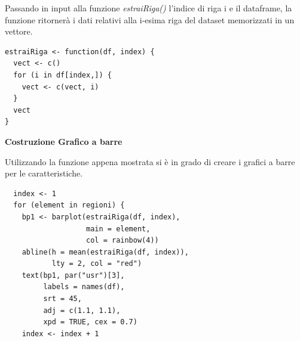 Passando in input alla funzione \textit{estraiRiga()} l'indice di riga i e il dataframe, la funzione ritornerà i dati relativi alla i-esima riga del dataset memorizzati in un vettore.

\vspace{5mm}
\begin{lstlisting}
estraiRiga <- function(df, index) {
  vect <- c()
  for (i in df[index,]) {
    vect <- c(vect, i)
  }
  vect
}
\end{lstlisting}
\vspace{5mm}

\noindent \textbf{Costruzione Grafico a barre}

Utilizzando la funzione appena mostrata si è in grado di creare i grafici a barre per le caratteristiche.

\vspace{5mm}
\begin{lstlisting}
  index <- 1
  for (element in regioni) {
    bp1 <- barplot(estraiRiga(df, index),
                   main = element,
                   col = rainbow(4))
    abline(h = mean(estraiRiga(df, index)),
           lty = 2, col = "red")
    text(bp1, par("usr")[3],
         labels = names(df),
         srt = 45,
         adj = c(1.1, 1.1),
         xpd = TRUE, cex = 0.7)
    index <- index + 1
\end{lstlisting}
\vspace{5mm}


